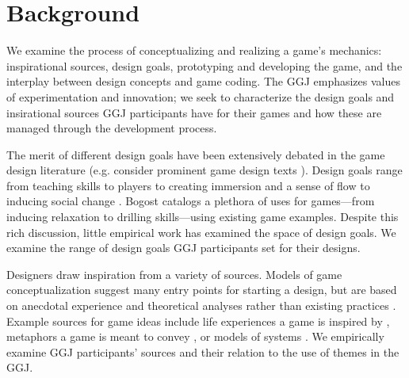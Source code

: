 \documentclass{sig-alternate}
\begin{document}



\section{Background}
We examine the process of conceptualizing and realizing a game's mechanics: inspirational sources, design goals, prototyping and developing the game, and the interplay between design concepts and game coding.
The GGJ emphasizes values of experimentation and innovation; we seek to characterize the design goals and insirational sources GGJ participants have for their games and how these are managed through the development process.

The merit of different design goals have been extensively debated in the game design literature (e.g. consider prominent game design texts \cite{fullerton2008:playcentric,salen2003:rulesplay,salen2006:reader,schell2008:gamedesign}). Design goals range from teaching skills to players \cite{koster2005:theory-fun} to creating immersion and a sense of flow \cite{salen2003:rulesplay} to inducing social change \cite{mcgonigal2011:realitybroken}. Bogost \cite{bogost2011:howto} catalogs a plethora of uses for games---from inducing relaxation to drilling skills---using existing game examples. Despite this rich discussion, little empirical work has examined the space of design goals. We examine the range of design goals GGJ participants set for their designs.

Designers draw inspiration from a variety of sources. Models of game conceptualization suggest many entry points for starting a design, but are based on anecdotal experience and theoretical analyses rather than existing practices \cite{hunicke2004:mda}. Example sources for game ideas include life experiences a game is inspired by \cite{anthropy2012:zinesters,treanor2010:kaboom}, metaphors a game is meant to convey \cite{rusch2008:game-metaphor}, or models of systems \cite{crawford1984:gamedesign}. We empirically examine GGJ participants' sources and their relation to the use of themes in the GGJ.
\end{document}
